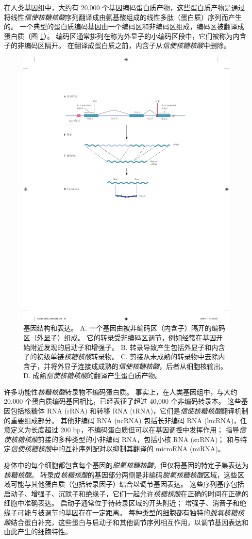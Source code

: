 在人类基因组中，大约有 20,000 个基因编码蛋白质产物，这些蛋白质产物是通过将线性\textit{信使核糖核酸}序列翻译成由氨基酸组成的线性多肽（蛋白质）序列而产生的。
一个典型的蛋白质编码基因由一个编码区和非编码区组成，编码区被翻译成蛋白质（图 \ref{fig:2_3}）。 
编码区通常排列在称为外显子的小编码区段中，它们被称为内含子的非编码区隔开。 
在翻译成蛋白质之前，内含子从\textit{信使核糖核酸}中删除。

\begin{figure}[htbp]
	\centering
	\includegraphics[width=0.5\linewidth]{chap02/fig_2_3}
	\caption{基因结构和表达。 
		A. 一个基因由被非编码区（内含子）隔开的编码区（外显子）组成。 
		它的转录受非编码区调节，例如经常在基因开始附近发现的启动子和增强子。 
		B. 转录导致产生包括外显子和内含子的初级单链\textit{核糖核酸}转录物。 
		C. 剪接从未成熟的转录物中去除内含子，并将外显子连接成成熟的\textit{信使核糖核酸}，后者从细胞核输出。
		D. 成熟\textit{信使核糖核酸}的翻译产生蛋白质产物。}
	\label{fig:2_3}
\end{figure}


许多功能性\textit{核糖核酸}转录物不编码蛋白质。 
事实上，在人类基因组中，与大约 20,000 个蛋白质编码基因相比，已经表征了超过 40,000 个非编码转录本。
这些基因包括核糖体 RNA (rRNA) 和转移 RNA (tRNA)，它们是\textit{信使核糖核酸}翻译机制的重要组成部分。 
其他非编码 RNA (ncRNA) 包括长非编码 RNA (lncRNA)，任意定义为长度超过 200 bp，不编码蛋白质但可以在基因调控中发挥作用； 
指导\textit{信使核糖核酸}剪接的多种类型的小非编码 RNA，包括小核 RNA (snRNA)； 
和与特定\textit{信使核糖核酸}中的互补序列配对以抑制其翻译的 microRNA (miRNA)。


身体中的每个细胞都包含每个基因的\textit{脱氧核糖核酸}，但仅将基因的特定子集表达为\textit{核糖核酸}。 
转录成\textit{核糖核酸}的基因部分两侧是非编码\textit{脱氧核糖核酸}区域，这些区域可能与其他蛋白质（包括转录因子）结合以调节基因表达。 
这些序列基序包括启动子、增强子、沉默子和绝缘子，它们一起允许\textit{核糖核酸}在正确的时间在正确的细胞中准确表达。 
启动子通常位于待转录区域的开头附近； 增强子、消音子和绝缘子可能与被调节的基因存在一定距离。 
每种类型的细胞都有独特的\textit{脱氧核糖核酸}结合蛋白补充，这些蛋白与启动子和其他调节序列相互作用，以调节基因表达和由此产生的细胞特性。


